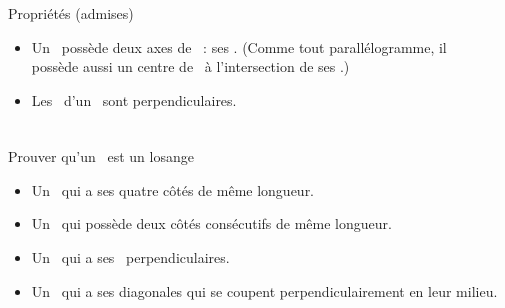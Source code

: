 \documentclass{beamer}
\begin{document}
\begin{frame}
	\frametitle{}  
	\framesubtitle{}
	
	\begin{columns}[onlytextwidth]	
		\begin{column}{0.65\textwidth}
			\begin{alertblock}{Propriétés (admises)}
				\begin{itemize}
					\item Un \los\ possède deux axes de \sym\ : ses \diags .
					(Comme tout parallélogramme, il possède aussi un centre de \sym\ à l'intersection de ses \diags .)
					
					\item Les \diags\ d'un \los\ sont perpendiculaires.
				\end{itemize}
				
			\end{alertblock}		
			
		\end{column}
		\begin{column}{0.35\textwidth}
		\end{column}	
	\end{columns}
\end{frame}

\begin{frame}
	\frametitle{}  
	\framesubtitle{}
	
			
			\begin{alertblock}{Prouver qu'un \myquad\ est un losange}
				\begin{itemize}
					\item Un \myquad\ qui a ses quatre côtés de même longueur.
					\item Un \para\  qui possède deux côtés consécutifs de même longueur.
					\item Un \para\ qui a ses \diags\ perpendiculaires.
					\item Un \myquad\ qui a ses diagonales qui se coupent perpendiculairement en leur milieu.
				\end{itemize}
			\end{alertblock}
			
\end{frame}
\end{document}
